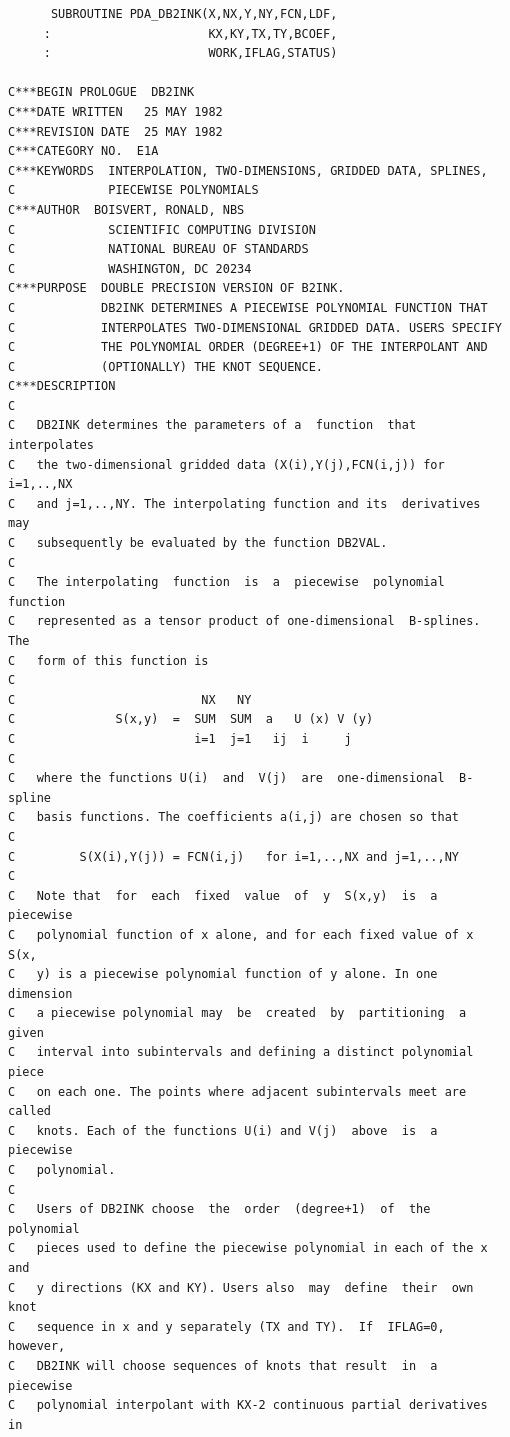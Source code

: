 \documentclass[11pt,twoside]{article}
\begin{document}
\begin{verbatim}
      SUBROUTINE PDA_DB2INK(X,NX,Y,NY,FCN,LDF,
     :                      KX,KY,TX,TY,BCOEF,
     :                      WORK,IFLAG,STATUS)

C***BEGIN PROLOGUE  DB2INK
C***DATE WRITTEN   25 MAY 1982
C***REVISION DATE  25 MAY 1982
C***CATEGORY NO.  E1A
C***KEYWORDS  INTERPOLATION, TWO-DIMENSIONS, GRIDDED DATA, SPLINES,
C             PIECEWISE POLYNOMIALS
C***AUTHOR  BOISVERT, RONALD, NBS
C             SCIENTIFIC COMPUTING DIVISION
C             NATIONAL BUREAU OF STANDARDS
C             WASHINGTON, DC 20234
C***PURPOSE  DOUBLE PRECISION VERSION OF B2INK.
C            DB2INK DETERMINES A PIECEWISE POLYNOMIAL FUNCTION THAT
C            INTERPOLATES TWO-DIMENSIONAL GRIDDED DATA. USERS SPECIFY
C            THE POLYNOMIAL ORDER (DEGREE+1) OF THE INTERPOLANT AND
C            (OPTIONALLY) THE KNOT SEQUENCE.
C***DESCRIPTION
C
C   DB2INK determines the parameters of a  function  that  interpolates
C   the two-dimensional gridded data (X(i),Y(j),FCN(i,j)) for i=1,..,NX
C   and j=1,..,NY. The interpolating function and its  derivatives  may
C   subsequently be evaluated by the function DB2VAL.
C
C   The interpolating  function  is  a  piecewise  polynomial  function
C   represented as a tensor product of one-dimensional  B-splines.  The
C   form of this function is
C
C                          NX   NY
C              S(x,y)  =  SUM  SUM  a   U (x) V (y)
C                         i=1  j=1   ij  i     j
C
C   where the functions U(i)  and  V(j)  are  one-dimensional  B-spline
C   basis functions. The coefficients a(i,j) are chosen so that
C
C         S(X(i),Y(j)) = FCN(i,j)   for i=1,..,NX and j=1,..,NY
C
C   Note that  for  each  fixed  value  of  y  S(x,y)  is  a  piecewise
C   polynomial function of x alone, and for each fixed value of x  S(x,
C   y) is a piecewise polynomial function of y alone. In one  dimension
C   a piecewise polynomial may  be  created  by  partitioning  a  given
C   interval into subintervals and defining a distinct polynomial piece
C   on each one. The points where adjacent subintervals meet are called
C   knots. Each of the functions U(i) and V(j)  above  is  a  piecewise
C   polynomial.
C
C   Users of DB2INK choose  the  order  (degree+1)  of  the  polynomial
C   pieces used to define the piecewise polynomial in each of the x and
C   y directions (KX and KY). Users also  may  define  their  own  knot
C   sequence in x and y separately (TX and TY).  If  IFLAG=0,  however,
C   DB2INK will choose sequences of knots that result  in  a  piecewise
C   polynomial interpolant with KX-2 continuous partial derivatives  in

\end{verbatim}
\end{document}
